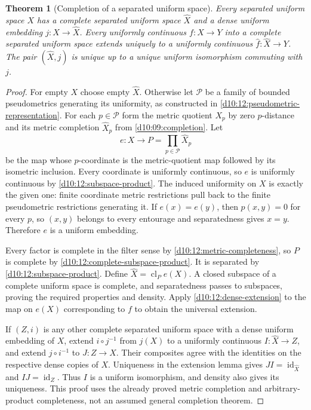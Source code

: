 \documentclass[11pt,oneside,openany]{book}
\newtheorem{theorem}{Theorem}[chapter]
\theoremstyle{definition}
\theoremstyle{remark}
\DeclareMathOperator{\id}{id}
\DeclareMathOperator{\cl}{cl}
\begin{document}
\begin{theorem}[Completion of a separated uniform space]\label{d10:12:uniform-completion}
Every separated uniform space $X$ has a complete separated uniform space $\widehat X$ and a dense uniform embedding $j:X\to\widehat X$. Every uniformly continuous $f:X\to Y$ into a complete separated uniform space extends uniquely to a uniformly continuous $\widehat f:\widehat X\to Y$. The pair $(\widehat X,j)$ is unique up to a unique uniform isomorphism commuting with $j$.
\end{theorem}
\begin{proof}
For empty $X$ choose empty $\widehat X$. Otherwise let $\mathcal P$ be a family of bounded pseudometrics generating its uniformity, as constructed in \cref{d10:12:pseudometric-representation}. For each $p\in\mathcal P$ form the metric quotient $X_p$ by zero $p$-distance and its metric completion $\widehat X_p$ from \cref{d10:09:completion}. Let
\[
 e:X\longrightarrow P=\prod_{p\in\mathcal P}\widehat X_p
\]
be the map whose $p$-coordinate is the metric-quotient map followed by its isometric inclusion. Every coordinate is uniformly continuous, so $e$ is uniformly continuous by \cref{d10:12:subspace-product}. The induced uniformity on $X$ is exactly the given one: finite coordinate metric restrictions pull back to the finite pseudometric restrictions generating it. If $e(x)=e(y)$, then $p(x,y)=0$ for every $p$, so $(x,y)$ belongs to every entourage and separatedness gives $x=y$. Therefore $e$ is a uniform embedding.

Every factor is complete in the filter sense by \cref{d10:12:metric-completeness}, so $P$ is complete by \cref{d10:12:complete-subspace-product}. It is separated by \cref{d10:12:subspace-product}. Define $\widehat X=\cl_P e(X)$. A closed subspace of a complete uniform space is complete, and separatedness passes to subspaces, proving the required properties and density. Apply \cref{d10:12:dense-extension} to the map on $e(X)$ corresponding to $f$ to obtain the universal extension.

If $(Z,i)$ is any other complete separated uniform space with a dense uniform embedding of $X$, extend $i\circ j^{-1}$ from $j(X)$ to a uniformly continuous $I:\widehat X\to Z$, and extend $j\circ i^{-1}$ to $J:Z\to\widehat X$. Their composites agree with the identities on the respective dense copies of $X$. Uniqueness in the extension lemma gives $JI=\id_{\widehat X}$ and $IJ=\id_Z$. Thus $I$ is a uniform isomorphism, and density also gives its uniqueness. This proof uses the already proved metric completion and arbitrary-product completeness, not an assumed general completion theorem.
\end{proof}
\end{document}

